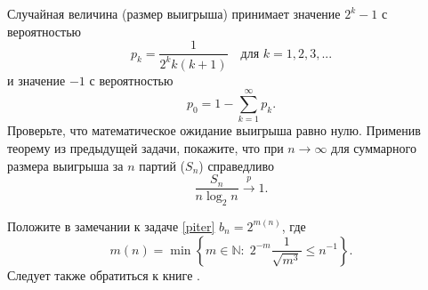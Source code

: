 \begin{problem}
Случайная величина (размер выигрыша) принимает значение $2^{k} -1$ с вероятностью 
$$p_{k} =\frac{1}{2^{k} k(k+1)} \quad \text{для~} k=1,2,3,...$$ 
и значение\textit{ $-1$} с вероятностью 
$$p_{0} =1-\sum _{k=1}^{\infty }p_{k} .$$ 
Проверьте, что математическое ожидание выигрыша равно нулю. Применив теорему из предыдущей задачи, покажите, что при $n\to \infty $  для суммарного размера выигрыша за $n$ партий ($S_{n} $) справедливо
$$\frac{S_{n} }{n \log _{2} n}\mathop{\to }\limits^{p} 1.$$

\begin{remark}  
Положите в замечании к задаче \ref{piter} $b_{n} =2^{m(n)} $, где $$m(n)=\min \left\{m\in \mathbb{N}:\; 2^{-m} \frac{1}{\sqrt{m^{3}}} \le n^{-1} \right\}.$$ Следует также обратиться к книге \cite{19}.
\end{remark} 

\end{problem}


